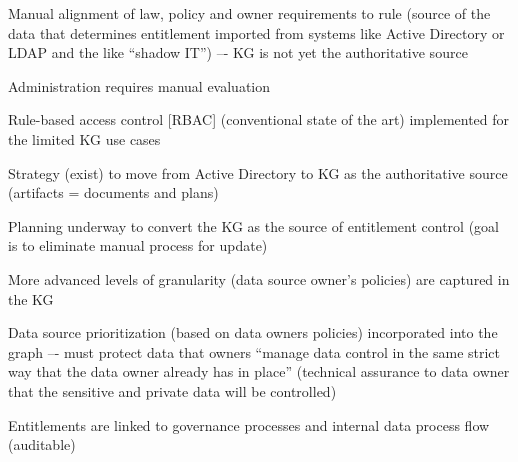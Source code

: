 \kgmmscoringsection

\kgmmscoringlevelOne

\begin{scoring}

  \item Manual alignment of law, policy and owner requirements to rule (source of the data that determines entitlement
        imported from systems like Active Directory or LDAP and the like “shadow IT”) –-
        KG is not yet the authoritative source
  \item Administration requires manual evaluation
  \item Rule-based access control [RBAC] (conventional state of the art) implemented for the limited KG use cases

\end{scoring}

\kgmmscoringlevelTwo

\begin{scoring}

  \item Strategy (exist) to move from Active Directory to KG as the authoritative source
        (artifacts = documents and plans)
  \item Planning underway to convert the KG as the source of entitlement control
        (goal is to eliminate manual process for update)
  \item More advanced levels of granularity (data source owner’s policies) are captured in the KG
  \item Data source prioritization (based on data owners policies) incorporated into the graph –-
        must protect data that owners “manage data control in the same strict way that the data owner
        already has in place” (technical assurance to data owner that the sensitive and private data will be controlled)
  \item Entitlements are linked to governance processes and internal data process flow (auditable)

\end{scoring}

\kgmmscoringlevelThree

